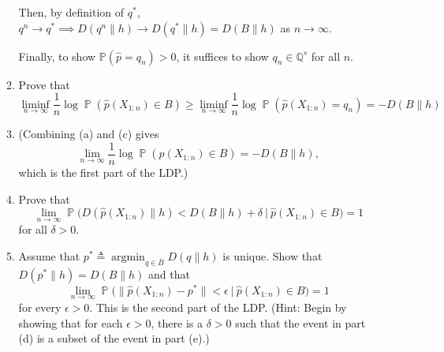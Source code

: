\documentclass[12pt]{article}
\renewcommand{\hat}[1]{\widehat{#1}}
\renewcommand{\P}{\mathbb{P}}
\newcommand{\Q}{\mathbb{Q}}
\DeclareMathOperator{\Prob}{\mathbb{P}}
\DeclareMathOperator*{\argmin}{\arg\min}
\begin{document}
\begin{enumerate}[1.]
\begin{enumerate}
		            Then, by definition of $q^*$, $q^n \to q^* \implies D(q^n \| h) \to D(q^* \| h) = D(B \| h)$ as $n \to \infty$.

		            Finally, to show $\P(\hat p = q_n) > 0$, it suffices to show $q_n \in \Q^s$ for all $n$.
		            \color{black}


		      \item Prove that \[ \liminf_{n\to\infty} \frac{1}{n} \log \Prob(\widehat p(X_{1:n}) \in B) \geq \liminf_{n\to\infty} \frac{1}{n} \log \Prob(\widehat p(X_{1:n}) = q_n) = -D(B\|h)  \]

		      \item[] (Combining (a) and (c) gives \[ \lim_{n\to\infty}   \frac{1}{n} \log \Prob(\widehat p(X_{1:n}) \in B) = -D(B\|h) , \label{e:D} \] which is the first part of the LDP.)

		      \item Prove that
		            \[ \lim_{n\to\infty} \Prob\big(D(\widehat p(X_{1:n})\|h) < D(B\|h)+\delta \ \big| \ \widehat p(X_{1:n}) \in B\big)  = 1  \]
		            for all $\delta > 0$.

		      \item Assume that $p^*\triangleq \argmin_{q\in \overline B} D(q\|h)$ is unique. Show that $D(p^*\|h)=D(B\|h)$ and that
		            \[ \lim_{n\to\infty} \Prob\big( \|\widehat p(X_{1:n})-p^*\|  < \epsilon \ \big| \ \widehat p(X_{1:n})\in B\big) = 1 \]
		            for every $\epsilon > 0$. This is the second part of the LDP.  (Hint: Begin by showing that for each $\epsilon > 0$, there is a $\delta > 0$ such that the event in part (d) is a subset of the event in part (e).)


	      \end{enumerate}
	      \label{last-item}
\end{enumerate}
\end{document}
